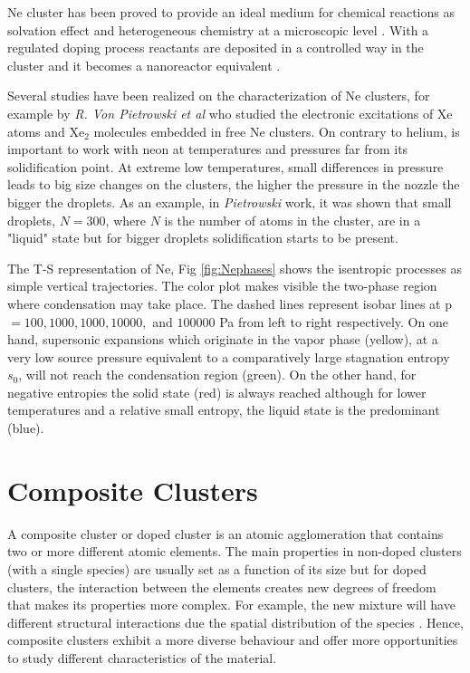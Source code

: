 Ne cluster has been proved to provide an ideal medium for chemical reactions as solvation effect and heterogeneous chemistry at a microscopic level \cite{gough_infrared_1985}. With a regulated doping process reactants are deposited in a controlled way in the cluster and it becomes a nanoreactor equivalent \cite{gaveau_reaction_2001}.

Several studies have been realized on the characterization of Ne clusters, for example  by \textit{R. Von Pietrowski et al}\cite{von_pietrowski_fluorescence_1997} who studied the electronic excitations of Xe atoms and Xe$_{2}$ molecules  embedded in free Ne clusters. On contrary to helium, is important to work with neon at temperatures and pressures far from its solidification point. At extreme low temperatures, small differences in pressure leads to big size changes on the clusters, the higher the pressure in the nozzle the bigger the droplets. As an example, in \textit{Pietrowski} work, it was shown that small droplets, $N=300$, where $N$ is the number of atoms in the cluster, are in a "liquid" state but for bigger droplets solidification starts to be present. 



The T-S representation of Ne, Fig \ref{fig:Nephases} shows the isentropic processes as simple vertical trajectories. The color plot makes visible the two-phase region where condensation may take place. The dashed lines represent isobar lines at p$= 100,1000,1000,10000,$ and $100000$ Pa from left to right respectively. On one hand, supersonic expansions which originate in the vapor phase (yellow), at a very low source pressure equivalent to a comparatively large stagnation entropy $s_{0}$, will not reach the condensation region (green). On the other hand, for negative entropies the solid state (red) is always reached although for lower temperatures and a relative small entropy, the liquid state is the predominant (blue).\cite{christen_supersonic_2010-1} 

\section{Composite Clusters}

A composite cluster or doped cluster is an atomic agglomeration that contains two or more different atomic elements. The main properties in non-doped clusters (with a single species) are usually set as a function of its size but for doped clusters, the interaction between the elements creates new degrees of freedom that makes its properties more complex. For example, the new mixture will have different structural interactions due the spatial distribution of the species \cite{stienkemeier_spectroscopy_2006}. Hence, composite clusters exhibit a more diverse behaviour and offer more opportunities to study different characteristics of the material.

